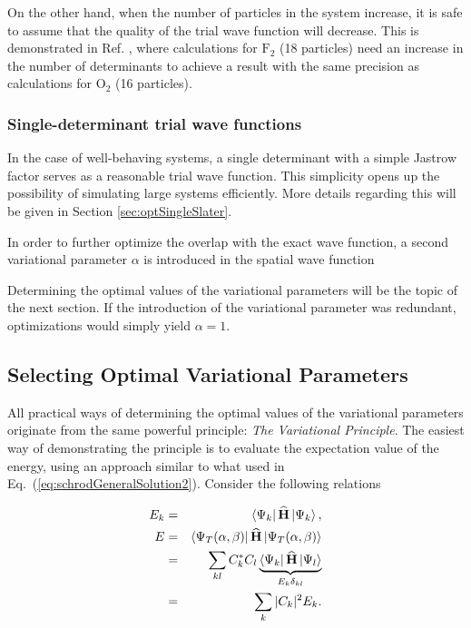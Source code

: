 On the other hand, when the number of particles in the system increase, it is safe to assume that the quality of the trial wave function will decrease. This is demonstrated in Ref. \cite{UmrigarMolecules}, where calculations for $\mathrm{F}_2$ (18 particles) need an increase in the number of determinants to achieve a result with the same precision as calculations for $\mathrm{O}_2$ (16 particles).  

\subsubsection{Single-determinant trial wave functions}

In the case of well-behaving systems, a single determinant with a simple Jastrow factor serves as a reasonable trial wave function. This simplicity opens up the possibility of simulating large systems efficiently.  More details regarding this will be given in Section \ref{sec:optSingleSlater}. 

In order to further optimize the overlap with the exact wave function, a second variational parameter $\alpha$ is introduced in the spatial wave function


Determining the optimal values of the variational parameters will be the topic of the next section. If the introduction of the variational parameter was redundant, optimizations would simply yield $\alpha=1$. 


\subsection{Selecting Optimal Variational Parameters}
\label{sec:selectingOptVarPar}

All practical ways of determining the optimal values of the variational parameters originate from the same powerful principle: \textit{The Variational Principle}. The easiest way of demonstrating the principle is to evaluate the expectation value of the energy, using an approach similar to what used in Eq.~(\ref{eq:schrodGeneralSolution2}). Consider the following relations

\begin{eqnarray*}
 E_k &=& \left< \Psi_k \right|{\bf\widehat{H}}\left| \Psi_k \right>,  \\
 E   &=& \left< \Psi_T(\alpha, \beta) \right|{\bf\widehat{H}}\left| \Psi_T(\alpha, \beta) \right>\\
     &=& \sum_{kl} C_k^\ast C_l \underbrace{\left< \Psi_k \right|{\bf\widehat{H}}\left| \Psi_l \right>}_{E_k\delta_{kl}} \\
     &=& \sum_k |C_k|^2E_k.
\end{eqnarray*}


